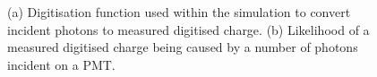 \begin{figure} %
    \centering
    \quad
    \caption[Simulation PMT digitisaion function.]
    {(a) Digitisation function used within the simulation to convert incident photons to measured
        digitised charge. (b) Likelihood of a measured digitised charge being caused by a number
        of photons incident on a PMT.}
    \label{fig:digitisation}
\end{figure}
